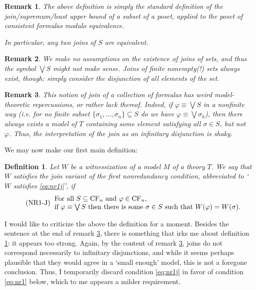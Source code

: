 \documentclass{article}
\newtheorem{remark}{Remark}
\newtheorem{definition}{Definition}
\theoremstyle{nonumberplain}
\newcommand{\CF}{\mathrm{CF}}
\begin{document}
\begin{remark}
The above definition is simply the standard definition of the join\slash supremum\slash least upper bound of a subset of a poset, applied to the poset of consistent formulas modulo equivalence.

In particular, any two joins of $S$ are equivalent.
\end{remark}

\begin{remark}
We make no assumptions on the existence of joins of sets, and thus the symbol $\bigvee S$ might not make sense. Joins of finite nonempty(!) sets always exist, though: simply consider the disjunction of all elements of the set.
\end{remark}

\begin{remark}\label{rmk:shaky}
This notion of join of a collection of formulas has weird model-theoretic repercussions, or rather lack thereof. Indeed, if $\varphi \equiv \bigvee S$ in a nonfinite way (i.e. for no finite subset $\{\sigma_1, \dots, \sigma_n\}\subseteq S$ do we have $\varphi \equiv \bigvee \sigma_k$), then there always exists a model of $T$ containing some element satisfying all $\sigma \in S$, but not $\varphi$. Thus, the interpretation of the join as an infinitary disjunction is shaky.
\end{remark}

We may now make our first main definition:
\begin{definition}\label{def:nr1j}
Let $W$ be a witnessization of a model $M$ of a theory $T$. We say that $W$ satisfies the \emph{join variant of the first nonredundancy condition}, abbreviated to `$W$ satisfies \eqref{eq:nr1j}', if
\begin{equation}
\tag{NR1-J}\label{eq:nr1j}
\begin{tabular}{ll}
For all $S \subseteq \CF_n$ and $\varphi \in \CF_n$,\\
if $\varphi \equiv \bigvee S$ then there is some $\sigma \in S$ such that $W(\varphi) = W(\sigma)$.
\end{tabular}
\end{equation}
\end{definition}

I would like to criticize the above the definition for a moment. Besides the sentence at the end of remark \ref{rmk:shaky}, there is something that irks me about definition \ref{def:nr1j}: it appears too strong. Again, by the content of remark \ref{rmk:shaky}, joins do not correspond necessarily to infinitary disjunctions, and while it seems perhaps plausible that they would agree in a `small enough' model, this is not a foregone conclusion. Thus, I temporarily discard condition \eqref{eq:nr1j} in favor of condition \eqref{eq:nr1} below, which to me appears a milder requirement.
\end{document}
